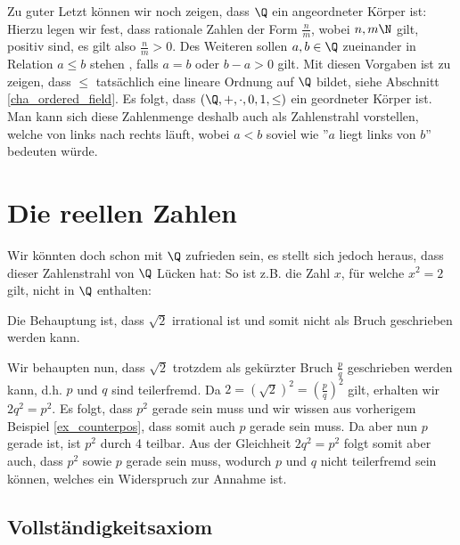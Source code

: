 Zu guter Letzt können wir noch zeigen, dass $\Q$ ein angeordneter Körper ist: Hierzu legen wir fest, dass rationale Zahlen der Form $\frac{n}{m}$, wobei $n,m \N$ gilt, positiv sind, es gilt also $\frac{n}{m} > 0$. Des Weiteren sollen $a, b \in \Q$ zueinander in Relation $a \leq b$ stehen , falls $a = b$ oder $ b-a >0$ gilt. Mit diesen Vorgaben ist zu zeigen, dass $\leq$ tatsächlich eine lineare Ordnung auf $\Q$ bildet, siehe Abschnitt \ref{cha_ordered_field}. Es folgt, dass $(\Q, +, \cdot,0, 1, \leq)$ ein geordneter Körper ist. Man kann sich diese Zahlenmenge deshalb auch als Zahlenstrahl vorstellen, welche von links nach rechts läuft, wobei $a < b$ soviel wie ''$a$ liegt links von $b$'' bedeuten würde.

\section{Die reellen Zahlen}
Wir könnten doch schon mit $\Q$ zufrieden sein, es stellt sich jedoch heraus, dass dieser Zahlenstrahl von $\Q$ Lücken hat: So ist z.B. die Zahl $x$, für welche $x^2 = 2$ gilt, nicht in $\Q$ enthalten:

\begin{example}\label{ex_sqrt2_irrational}
Die Behauptung ist, dass $\sqrt{2}$ irrational ist und somit nicht als Bruch geschrieben werden kann.

Wir behaupten nun, dass $\sqrt{2}$ trotzdem als gekürzter Bruch $\frac{p}{q}$ geschrieben werden kann, d.h. $p$ und $q$ sind teilerfremd. Da $2 = (\sqrt{2})^2 = (\frac{p}{q})^2$ gilt, erhalten wir $2 q^2 = p^2$. Es folgt, dass $p^2$ gerade sein muss und wir wissen aus vorherigem Beispiel \ref{ex_counterpos}, dass somit auch $p$ gerade sein muss. Da aber nun $p$ gerade ist, ist $p^2$ durch 4 teilbar. Aus der Gleichheit $2 q^2 = p^2$ folgt somit aber auch, dass $p^2$ sowie $p$ gerade sein muss, wodurch $p$ und $q$ nicht teilerfremd sein können, welches ein Widerspruch zur Annahme ist. 
\end{example}

\subsection{Vollständigkeitsaxiom}\label{cha_completeness}

